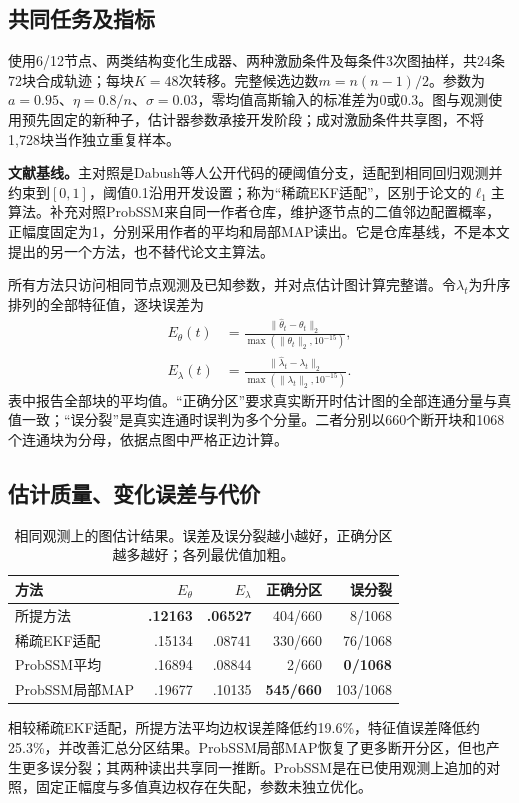 \documentclass[journal]{IEEEtran}
\begin{document}
\subsection{共同任务及指标}
使用6/12节点、两类结构变化生成器、两种激励条件及每条件3次图抽样，共24条72块合成轨迹；每块$K=48$次转移。完整候选边数$m=n(n-1)/2$。参数为$a=0.95$、$\eta=0.8/n$、$\sigma=0.03$，零均值高斯输入的标准差为0或0.3。图与观测使用预先固定的新种子，估计器参数承接开发阶段；成对激励条件共享图，不将1,728块当作独立重复样本。

\textbf{文献基线。}主对照是Dabush等人公开代码\cite{dabush,code}的硬阈值分支，适配到相同回归观测并约束到$[0,1]$，阈值0.1沿用开发设置；称为“稀疏EKF适配”，区别于论文的$\ell_1$主算法。补充对照ProbSSM来自同一作者仓库\cite{code}，维护逐节点的二值邻边配置概率，正幅度固定为1，分别采用作者的平均和局部MAP读出。它是仓库基线，不是本文提出的另一个方法，也不替代论文主算法。

所有方法只访问相同节点观测及已知参数，并对点估计图计算完整谱。令$\lambda_t$为升序排列的全部特征值，逐块误差为
\begin{equation}
 \begin{aligned}
E_\theta(t)&=\frac{\|\hat\theta_t-\theta_t\|_2}{\max(\|\theta_t\|_2,10^{-15})},\\
E_\lambda(t)&=\frac{\|\hat\lambda_t-\lambda_t\|_2}{\max(\|\lambda_t\|_2,10^{-15})}.
\end{aligned}
\end{equation}
表中报告全部块的平均值。“正确分区”要求真实断开时估计图的全部连通分量与真值一致；“误分裂”是真实连通时误判为多个分量。二者分别以660个断开块和1068个连通块为分母，依据点图中严格正边计算。

\subsection{估计质量、变化误差与代价}
\begin{table}[t]
\caption{相同观测上的图估计结果。误差及误分裂越小越好，正确分区越多越好；各列最优值加粗。}\label{tab:main}
\centering\scriptsize\setlength{\tabcolsep}{3pt}
\begin{tabular}{lrrrr}\toprule
方法 & $E_\theta$ & $E_\lambda$ & 正确分区 & 误分裂\\\midrule
所提方法 & \textbf{.12163} & \textbf{.06527} & 404/660 & 8/1068\\
稀疏EKF适配 & .15134 & .08741 & 330/660 & 76/1068\\
ProbSSM平均 & .16894 & .08844 & 2/660 & \textbf{0/1068}\\
ProbSSM局部MAP & .19677 & .10135 & \textbf{545/660} & 103/1068\\\bottomrule
\end{tabular}
\end{table}
相较稀疏EKF适配，所提方法平均边权误差降低约19.6\%，特征值误差降低约25.3\%，并改善汇总分区结果。ProbSSM局部MAP恢复了更多断开分区，但也产生更多误分裂；其两种读出共享同一推断。ProbSSM是在已使用观测上追加的对照，固定正幅度与多值真边权存在失配，参数未独立优化。
\end{document}
